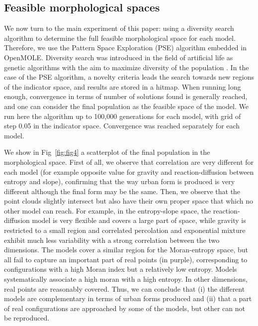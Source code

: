 \documentclass[10pt,letterpaper]{article}
\begin{document}
\subsection*{Feasible morphological spaces}

We now turn to the main experiment of this paper: using a diversity search algorithm to determine the full feasible morphological space for each model. Therefore, we use the Pattern Space Exploration (PSE) algorithm \cite{cherel2015beyond} embedded in OpenMOLE. Diversity search was introduced in the field of artificial life as genetic algorithms with the aim to maximize diversity of the population \cite{lehman2008exploiting}. In the case of the PSE algorithm, a novelty criteria leads the search towards new regions of the indicator space, and results are stored in a hitmap. When running long enough, convergence in terms of number of solutions found is generally reached, and one can consider the final population as the feasible space of the model. We run here the algorithm up to 100,000 generations for each model, with grid of step 0.05 in the indicator space. Convergence was reached separately for each model.

We show in Fig~\ref{fig:fig4} a scatterplot of the final population in the morphological space. First of all, we observe that correlation are very different for each model (for example opposite value for gravity and reaction-diffusion between entropy and slope), confirming that the way urban form is produced is very different although the final form may be the same. Then, we observe that the point clouds slightly intersect but also have their own proper space that which no other model can reach. For example, in the entropy-slope space, the reaction-diffusion model is very flexible and covers a large part of space, while gravity is restricted to a small region and correlated percolation and exponential mixture exhibit much less variability with a strong correlation between the two dimensions. The models cover a similar region for the Moran-entropy space, but all fail to capture an important part of real points (in purple), corresponding to configurations with a high Moran index but a relatively low entropy. Models systematically associate a high moran with a high entropy. In other dimensions, real points are reasonably covered. Thus, we can conclude that (i) the different models are complementary in terms of urban forms produced and (ii) that a part of real configurations are approached by some of the models, but other can not be reproduced.
\end{document}
